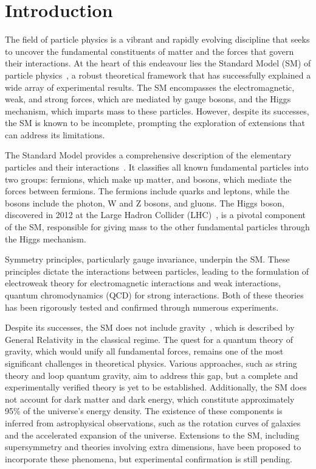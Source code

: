 
\chapter{Introduction}

The field of particle physics is a vibrant and rapidly evolving discipline that seeks to 
uncover the fundamental constituents of matter and the forces that govern their interactions. 
At the heart of this endeavour lies the Standard Model (SM) of particle physics~\cite{ParticleDataGroup:2022pth}, a robust 
theoretical framework that has successfully explained a wide array of experimental results. 
The SM encompasses the electromagnetic, weak, and strong forces, which are mediated by gauge 
bosons, and the Higgs mechanism, which imparts mass to these particles. However, despite 
its successes, the SM is known to be incomplete, prompting the exploration of extensions 
that can address its limitations.

The Standard Model provides a comprehensive description of the elementary particles and 
their interactions~\cite{RevModPhys.71.S96}. It classifies all known fundamental particles into two groups: 
fermions, which make up matter, and bosons, which mediate the forces between fermions. 
The fermions include quarks and leptons, while the bosons include the photon, W and Z bosons, 
and gluons. The Higgs boson, discovered in 2012 at the Large Hadron Collider (LHC)~\cite{Evans:2008zzb}, 
is a pivotal component of the SM, responsible for giving mass to the other fundamental particles 
through the Higgs mechanism.

Symmetry principles, particularly gauge invariance, underpin the SM. These principles dictate 
the interactions between particles, leading to the formulation of electroweak theory 
for electromagnetic interactions and weak interactions, quantum chromodynamics (QCD) for strong interactions.
Both of these theories has been rigorously tested
and confirmed through numerous experiments.

Despite its successes, the SM does not include gravity~\cite{Carlip_2015}, which is described by General Relativity 
in the classical regime. The quest for a quantum theory of gravity, which would unify all fundamental 
forces, remains one of the most significant challenges in theoretical physics. Various approaches, 
such as string theory and loop quantum gravity, aim to address this gap, but a complete and 
experimentally verified theory is yet to be established. Additionally, the SM does not account 
for dark matter and dark energy, which constitute approximately 95\%
of the universe's energy density. The existence of these components is inferred from astrophysical 
observations, such as the rotation curves of galaxies and the accelerated expansion of the universe. 
Extensions to the SM, including supersymmetry and theories involving extra dimensions, have been proposed 
to incorporate these phenomena, but experimental confirmation is still pending.


